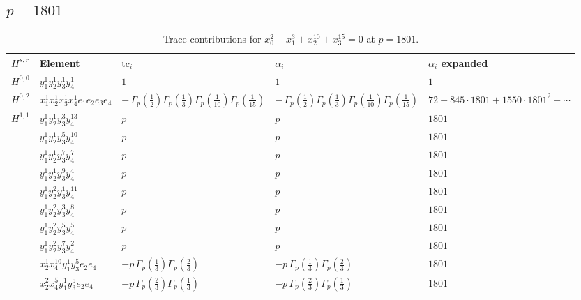 \documentclass[11pt]{article}
\begin{document}
\subsection*{$p = 1801$}

\begin{table}[ht]
\centering
\caption{Trace contributions for $x_0^{2} + x_1^{3} + x_2^{10} + x_3^{15} = 0$ at $p=1801$.}\label{tab:diagonal-2}
\renewcommand{\arraystretch}{1.1}
{\scriptsize
\begin{tabular}{@{}lllll@{}}
\toprule
$H^{s,r}$ & Element & $\mathrm{tc}_i$ & $\alpha_i$ & $\alpha_i$ expanded \\
\midrule
$H^{0,0}$ & $y_{1}^{1} y_{2}^{1} y_{3}^{1} y_{4}^{1}$ & $1$ & $1$ & $1$ \\
\midrule
$H^{0,2}$ & $x_{1}^{1} x_{2}^{1} x_{3}^{1} x_{4}^{1}  e_{1} e_{2} e_{3} e_{4}$ & $- \, \Gamma_p \left( \frac{1}{2} \right) \Gamma_p \left( \frac{1}{3} \right) \Gamma_p \left( \frac{1}{10} \right) \Gamma_p \left( \frac{1}{15} \right)$ & $- \, \Gamma_p \left( \frac{1}{2} \right) \Gamma_p \left( \frac{1}{3} \right) \Gamma_p \left( \frac{1}{10} \right) \Gamma_p \left( \frac{1}{15} \right)$ & $72{+}845{\cdot}1801{+}1550{\cdot}1801^{2}{+}\cdots$ \\
\midrule
$H^{1,1}$ & $y_{1}^{1} y_{2}^{1} y_{3}^{3} y_{4}^{13}$ & $p \,$ & $p \,$ & $1801$ \\
 & $y_{1}^{1} y_{2}^{1} y_{3}^{5} y_{4}^{10}$ & $p \,$ & $p \,$ & $1801$ \\
 & $y_{1}^{1} y_{2}^{1} y_{3}^{7} y_{4}^{7}$ & $p \,$ & $p \,$ & $1801$ \\
 & $y_{1}^{1} y_{2}^{1} y_{3}^{9} y_{4}^{4}$ & $p \,$ & $p \,$ & $1801$ \\
 & $y_{1}^{1} y_{2}^{2} y_{3}^{1} y_{4}^{11}$ & $p \,$ & $p \,$ & $1801$ \\
 & $y_{1}^{1} y_{2}^{2} y_{3}^{3} y_{4}^{8}$ & $p \,$ & $p \,$ & $1801$ \\
 & $y_{1}^{1} y_{2}^{2} y_{3}^{5} y_{4}^{5}$ & $p \,$ & $p \,$ & $1801$ \\
 & $y_{1}^{1} y_{2}^{2} y_{3}^{7} y_{4}^{2}$ & $p \,$ & $p \,$ & $1801$ \\
 & $x_{2}^{1} x_{4}^{10} y_{1}^{1} y_{3}^{5} e_{2} e_{4}$ & $- p \, \Gamma_p \left( \frac{1}{3} \right) \Gamma_p \left( \frac{2}{3} \right)$ & $- p \, \Gamma_p \left( \frac{1}{3} \right) \Gamma_p \left( \frac{2}{3} \right)$ & $1801$ \\
 & $x_{2}^{2} x_{4}^{5} y_{1}^{1} y_{3}^{5} e_{2} e_{4}$ & $- p \, \Gamma_p \left( \frac{2}{3} \right) \Gamma_p \left( \frac{1}{3} \right)$ & $- p \, \Gamma_p \left( \frac{2}{3} \right) \Gamma_p \left( \frac{1}{3} \right)$ & $1801$ \\

\end{tabular}}
\end{table}
\end{document}
